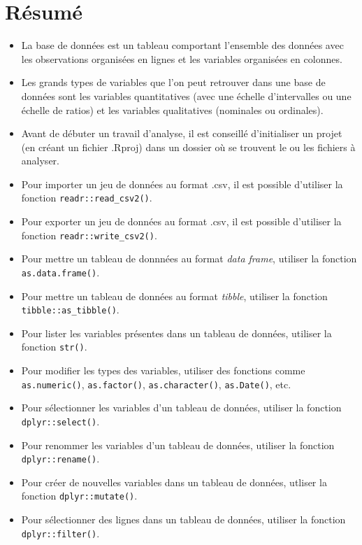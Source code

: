 \documentclass[
  french,
]{book}
\providecommand{\tightlist}{%
  \setlength{\itemsep}{0pt}\setlength{\parskip}{0pt}}
\begin{document}
\hypertarget{ruxe9sumuxe9-1}{%
\section{Résumé}\label{ruxe9sumuxe9-1}}

\begin{itemize}
\tightlist
\item
  La base de données est un tableau comportant l'ensemble des données avec les observations organisées en lignes et les variables organisées en colonnes.
\item
  Les grands types de variables que l'on peut retrouver dans une base de données sont les variables quantitatives (avec une échelle d'intervalles ou une échelle de ratios) et les variables qualitatives (nominales ou ordinales).
\item
  Avant de débuter un travail d'analyse, il est conseillé d'initialiser un projet (en créant un fichier .Rproj) dans un dossier où se trouvent le ou les fichiers à analyser.
\item
  Pour importer un jeu de données au format .csv, il est possible d'utiliser la fonction \texttt{readr::read\_csv2()}.
\item
  Pour exporter un jeu de données au format .csv, il est possible d'utiliser la fonction \texttt{readr::write\_csv2()}.
\item
  Pour mettre un tableau de donnnées au format \emph{data frame}, utiliser la fonction \texttt{as.data.frame()}.
\item
  Pour mettre un tableau de données au format \emph{tibble}, utiliser la fonction \texttt{tibble::as\_tibble()}.
\item
  Pour lister les variables présentes dans un tableau de données, utiliser la fonction \texttt{str()}.
\item
  Pour modifier les types des variables, utiliser des fonctions comme \texttt{as.numeric()}, \texttt{as.factor()}, \texttt{as.character()}, \texttt{as.Date()}, etc.
\item
  Pour sélectionner les variables d'un tableau de données, utiliser la fonction \texttt{dplyr::select()}.
\item
  Pour renommer les variables d'un tableau de données, utiliser la fonction \texttt{dplyr::rename()}.
\item
  Pour créer de nouvelles variables dans un tableau de données, utliser la fonction \texttt{dplyr::mutate()}.
\item
  Pour sélectionner des lignes dans un tableau de données, utiliser la fonction \texttt{dplyr::filter()}.

\end{itemize}
\end{document}
